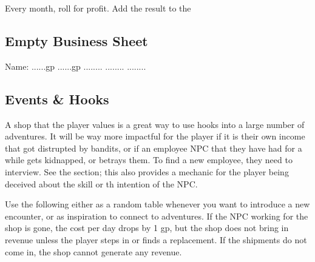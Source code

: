 \documentclass[twocolumn]{dndbook}
\begin{document}
Every month, roll for profit. Add the result to the



\subsection{Empty Business Sheet}

\begin{DndMonster}[width=.5\textwidth - 8pt]{Name:}
	\hfill ......gp
	\hfill ......gp
	\hfill ........
	\hfill ........
	\hfill ........


\end{DndMonster}


\subsection{Events \& Hooks}

A shop that the player values is a great way to use hooks into a large number of adventures.
It will be way more impactful for the player if it is their own income that got distrupted by bandits,
or if an employee NPC that they have had for a while gets kidnapped, or betrays them.
To find a new employee, they need to interview. See the  section;
this also provides a mechanic for the player being deceived about the skill or th intention of the NPC.\par


Use the following either as a random table whenever you want to introduce a new encounter, or as inspiration to connect to adventures.
If the NPC working for the shop is gone, the cost per day drops by 1 gp, but the shop does not bring in revenue unless the player steps in or finds a replacement.
If the shipments do not come in, the shop cannot generate any revenue.\par
\end{document}
